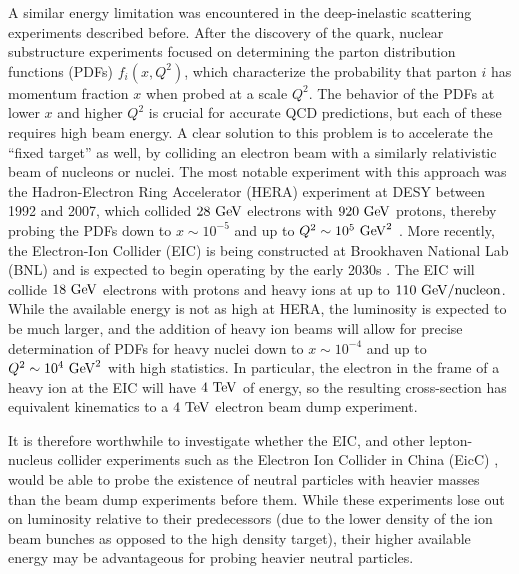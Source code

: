 A similar energy limitation was encountered in the deep-inelastic scattering experiments described before. After the discovery of the quark, nuclear substructure experiments focused on determining the parton distribution functions (PDFs) $f_i(x, Q^2)$, which characterize the probability that parton $i$ has momentum fraction $x$ when probed at a scale $Q^2$. The behavior of the PDFs at lower $x$ and higher $Q^2$ is crucial for accurate QCD predictions, but each of these requires high beam energy. A clear solution to this problem is to accelerate the ``fixed target'' as well, by colliding an electron beam with a similarly relativistic beam of nucleons or nuclei. The most notable experiment with this approach was the Hadron-Electron Ring Accelerator (HERA) experiment at DESY between 1992 and 2007, which collided $28~{\rm GeV}$ electrons with $920~{\rm GeV}$ protons, thereby probing the PDFs down to $x \sim 10^{-5}$ and up to $Q^2 \sim 10^5~{\rm GeV}^2$ \cite{Wichmann:2007zf}. More recently, the Electron-Ion Collider (EIC) is being constructed at Brookhaven National Lab (BNL) and is expected to begin operating by the early 2030s \cite{AbdulKhalek:2021gbh}. The EIC will collide $18~{\rm GeV}$ electrons with protons and heavy ions at up to $110~{\rm GeV}/{\rm nucleon}$. While the available energy is not as high at HERA, the luminosity is expected to be much larger, and the addition of heavy ion beams will allow for precise determination of PDFs for heavy nuclei down to $x \sim 10^{-4}$ and up to $Q^2 \sim 10^4~{\rm GeV}^2$ with high statistics. In particular, the electron in the frame of a heavy ion at the EIC will have $4~{\rm TeV}$ of energy, so the resulting cross-section has equivalent kinematics to a $4~{\rm TeV}$ electron beam dump experiment.

It is therefore worthwhile to investigate whether the EIC, and other lepton-nucleus collider experiments such as the Electron Ion Collider in China (EicC) \cite{Anderle:2021wcy}, would be able to probe the existence of neutral particles with heavier masses than the beam dump experiments before them. While these experiments lose out on luminosity relative to their predecessors (due to the lower density of the ion beam bunches as opposed to the high density target), their higher available energy may be advantageous for probing heavier neutral particles.


